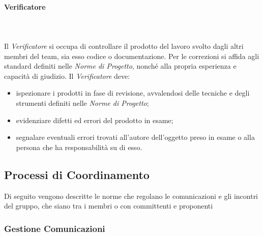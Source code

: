 \paragraph{Verificatore}\mbox{} \\ \mbox{} \\
Il \textit{Verificatore} si occupa di controllare il prodotto del lavoro svolto dagli altri membri del team, sia esso codice o documentazione. Per le correzioni si affida agli standard definiti nelle \textit{Norme di Progetto}, nonché alla propria esperienza e capacità di giudizio.
Il \textit{Verificatore} deve:
\begin{itemize}
	\item ispezionare i prodotti in fase di revisione, avvalendosi delle tecniche e degli strumenti definiti nelle \textit{Norme di Progetto};
	\item evidenziare difetti ed errori del prodotto in esame;
	\item segnalare eventuali errori trovati all'autore dell'oggetto preso in esame o alla persona che ha responsabilità su di esso.
\end{itemize}

\subsection{Processi di Coordinamento}
Di seguito vengono descritte le norme che regolano le comunicazioni e gli incontri del gruppo, che siano tra i membri o con committenti e proponenti
\subsubsection{Gestione Comunicazioni}
